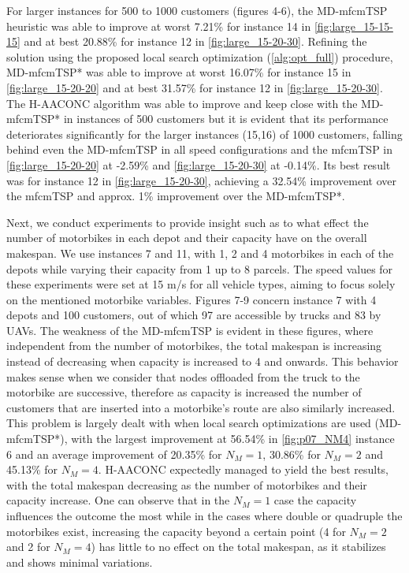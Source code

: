 \documentclass{article}
\begin{document}
	\par
	For larger instances for 500 to 1000 customers (figures 4-6), the MD-mfcmTSP heuristic was able to improve at worst 7.21\% for instance 14 in \autoref{fig:large_15-15-15} and at best 20.88\% for instance 12 in \autoref{fig:large_15-20-30}. Refining the solution using the proposed local search optimization (\autoref{alg:opt_full}) procedure, MD-mfcmTSP* was able to improve at worst 16.07\% for instance 15 in \autoref{fig:large_15-20-20} and at best 31.57\% for instance 12 in \autoref{fig:large_15-20-30}. The H-AACONC algorithm was able to improve and keep close with the MD-mfcmTSP* in instances of 500 customers but it is evident that its performance deteriorates significantly for the larger instances (15,16) of 1000 customers, falling behind even the MD-mfcmTSP in all speed configurations and the mfcmTSP in \autoref{fig:large_15-20-20} at -2.59\% and \ref{fig:large_15-20-30} at -0.14\%. Its best result was for instance 12 in \autoref{fig:large_15-20-30}, achieving a 32.54\% improvement over the mfcmTSP and approx. 1\% improvement over the MD-mfcmTSP*.
	\par 
	Next, we conduct experiments to provide insight such as to what effect the number of motorbikes in each depot and their capacity have on the overall makespan. We use instances 7 and 11, with 1, 2 and 4 motorbikes in each of the depots while varying their capacity from 1 up to 8 parcels. The speed values for these experiments were set at 15 m/s for all vehicle types, aiming to focus solely on the mentioned motorbike variables. Figures 7-9 concern instance 7 with 4 depots and 100 customers, out of which 97 are accessible by trucks and 83 by UAVs. The weakness of the MD-mfcmTSP is evident in these figures, where independent from the number of motorbikes, the total makespan is increasing instead of decreasing when capacity is increased to 4 and onwards. This behavior makes sense when we consider that nodes offloaded from the truck to the motorbike are successive, therefore as capacity is increased the number of customers that are inserted into a motorbike's route are also similarly increased. This problem is largely dealt with when local search optimizations are used (MD-mfcmTSP*), with the largest improvement at 56.54\% in \autoref{fig:p07_NM4} instance 6 and an average improvement of 20.35\% for $N_M=1$, 30.86\% for $N_M=2$ and 45.13\% for $N_M=4$. H-AACONC expectedly managed to yield the best results, with the total makespan decreasing as the number of motorbikes and their capacity increase. One can observe that in the $N_M=1$ case the capacity influences the outcome the most while in the cases where double or quadruple the motorbikes exist, increasing the capacity beyond a certain point (4 for $N_M=2$ and 2 for $N_M=4$) has little to no effect on the total makespan, as it stabilizes and shows minimal variations.
\end{document}
